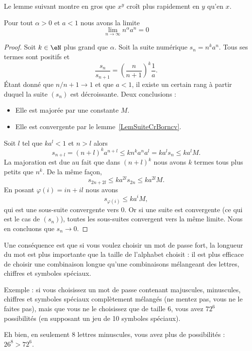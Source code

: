 Le lemme suivant montre en gros que \( x^y\) croît plus rapidement en \( y\) qu'en \( x\). 
\begin{lemma}       \label{LemLJOSooEiNtTs}
     Pour tout \( \alpha>0\) et \( a<1\) nous avons la limite
     \begin{equation}
         \lim_{n\to \infty} n^{\alpha}a^n=0
     \end{equation}
\end{lemma}

\begin{proof}
    Soit \( k\in \eN\) plus grand que \( \alpha\).
    Soit la suite numérique \( s_n=n^ka^n\). Tous ses termes sont positifs et
    \begin{equation}
        \frac{ s_n }{ s_{n+1} }=\left( \frac{ n }{ n+1 } \right)^k\frac{1}{ a }.
    \end{equation}
    Étant donné que \( n/n+1\to 1\) et que \( a<1\), il existe un certain rang à partir duquel la suite \( (s_n)\) est décroissante. Deux conclusions :
    \begin{itemize}
        \item Elle est majorée par une constante \( M\).
        \item Elle est convergente par le lemme~\ref{LemSuiteCrBorncv}.
    \end{itemize}
    Soit \( l\) tel que \( ka^l<1\) et \( n>l\) alors
    \begin{equation}
        s_{n+l}=(n+l)^ka^{n+l}\leq kn^ka^na^l=ka^ls_n\leq ka^lM.
    \end{equation}
    La majoration est due au fait que dans \( (n+l)^k\) nous avons \( k\) termes tous plus petits que \( n^k\). De la même façon,
    \begin{equation}
        s_{2n+2l}\leq ka^{2l}s_{2n}\leq ka^{2l}M.
    \end{equation}
    En posant \( \varphi(i)=in+il\) nous avons
    \begin{equation}
        s_{\varphi(i)}\leq ka^iM,
    \end{equation}
    qui est une sous-suite convergente vers \( 0\). Or si une suite est convergente (ce qui est le cas de \( (s_n)\)), toutes les sous-suites convergent vers la même limite. Nous en concluons que \( s_n\to 0\).
\end{proof}

\begin{normaltext}
    Une conséquence est que si vous voulez choisir un mot de passe fort, la longueur du mot est plus importante que la taille de l'alphabet choisit : il est plus efficace de choisir une combinaison longue qu'une combinaisons mélangeant des lettres, chiffres et symboles spéciaux.
    
    Exemple : si vous choisissez un mot de passe contenant majuscules, minuscules, chiffres et symboles spéciaux complètement mélangés (ne mentez pas, vous ne le faites pas), mais que vous ne le choisissez que de taille \( 6\), vous avez \( 72^6\) possibilités (en supposant un jeu de 10 symboles spéciaux).

    Eh bien, en seulement \( 8\) lettres minuscules, vous avez plus de possibilités : \( 26^8>72^6\).
\end{normaltext}

